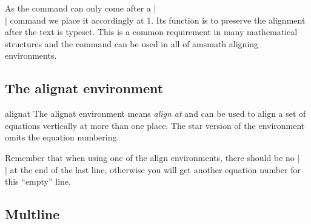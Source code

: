 {{{As the command  can only come after a |\\|  command we place it accordingly at {1}. Its function is to preserve the alignment after the text is typeset. This is a common requirement in many mathematical 
structures and the command can be used in all of amsmath aligning environments.







\subsection{The alignat environment}

\begin{docEnvironment}{alignat}{}
The alignat environment means \emph{align at} and can be used to align a set of equations vertically at more than one place. The star version of the environment omits the equation numbering.
\end{docEnvironment}


%



Remember that when using one of the align environments, there should be no |\\| at the end of the
last line, otherwise you will get another equation number for this ``empty''  line.


\subsection{Multline}

}}}
